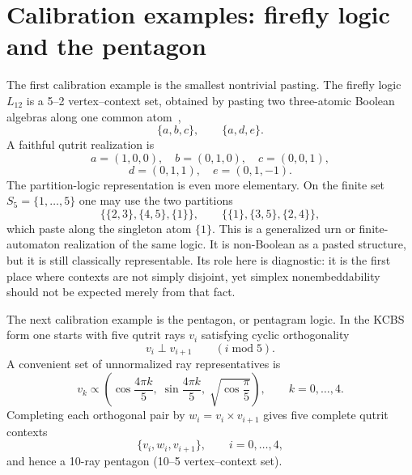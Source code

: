 \documentclass[aps,pra,twocolumn,superscriptaddress,nofootinbib]{revtex4-2}
\begin{document}
\section{Calibration examples: firefly logic and the pentagon}
\label{sec:calibration}

The first calibration example is the smallest nontrivial pasting.  The firefly logic $L_{12}$ is a 5--2 vertex--context set, obtained by pasting two three-atomic Boolean algebras along one common atom~\cite{cohen},
\begin{equation}
        \{a,b,c\},\qquad \{a,d,e\}.
\end{equation}
A faithful qutrit realization is
\begin{equation}
        a=(1,0,0),\quad b=(0,1,0),\quad c=(0,0,1),
\end{equation}
\begin{equation}
        d=(0,1,1),\quad e=(0,1,-1).
\end{equation}
The partition-logic representation is even more elementary.  On the finite set $S_5=\{1,\ldots,5\}$ one may use the two partitions
\begin{equation}
        \bigl\{\{2,3\},\{4,5\},\{1\}\bigr\},\qquad
        \bigl\{\{1\},\{3,5\},\{2,4\}\bigr\},
        \label{eq:l12-partition}
\end{equation}
which paste along the singleton atom $\{1\}$.  This is a generalized urn or finite-automaton realization of the same logic.  It is non-Boolean as a pasted structure, but it is still classically representable.  Its role here is diagnostic: it is the first place where contexts are not simply disjoint, yet simplex nonembeddability should not be expected merely from that fact.

The next calibration example is the pentagon, or pentagram logic.  In the KCBS form one starts with five qutrit rays $v_i$ satisfying cyclic orthogonality
\begin{equation}
        v_i\perp v_{i+1}\qquad (i\;\mathrm{mod}\;5).
\end{equation}
A convenient set of unnormalized ray representatives is
\begin{equation}
        v_k\propto\left(
        \cos\frac{4\pi k}{5},\;
        \sin\frac{4\pi k}{5},\;
        \sqrt{\cos\frac{\pi}{5}}
        \right),\qquad k=0,\ldots,4.
        \label{eq:kcbs-rays}
\end{equation}
Completing each orthogonal pair by $w_i=v_i\times v_{i+1}$ gives five complete qutrit contexts
\begin{equation}
        \{v_i,w_i,v_{i+1}\},\qquad i=0,\ldots,4,
        \label{eq:pentagon-contexts}
\end{equation}
and hence a 10-ray pentagon (10--5 vertex--context set).
\end{document}
